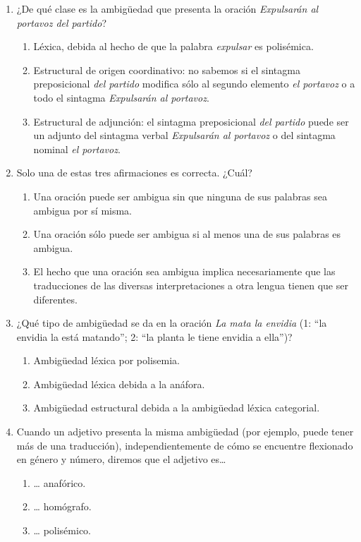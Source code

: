 \begin{enumerate}
\item ¿De qué clase es la ambigüedad que presenta la oración \emph{Expulsarán al portavoz del partido}? \begin{enumerate} \item Léxica, debida al hecho de que la palabra \emph{expulsar} es polisémica. \item Estructural de origen coordinativo: no sabemos si el sintagma preposicional \emph{del partido} modifica sólo al segundo elemento \emph{el portavoz} o a todo el sintagma \emph{Expulsarán al portavoz}. \item Estructural de adjunción: el sintagma preposicional \emph{del partido} puede ser un adjunto del sintagma verbal \emph{Expulsarán al portavoz} o del sintagma nominal \emph{el portavoz}. \end{enumerate} 

\item Solo una de estas tres afirmaciones es correcta. ¿Cuál? \begin{enumerate} \item Una oración puede ser ambigua sin que ninguna de sus palabras sea ambigua por sí misma. \item Una oración sólo puede ser ambigua si al menos una de sus palabras es ambigua. \item El hecho que una oración sea ambigua implica necesariamente que las traducciones de las diversas interpretaciones a otra lengua tienen que ser diferentes. \end{enumerate} 

\item ¿Qué tipo de ambigüedad se da en la oración \emph{La mata la envidia} (1: ``la envidia la está matando''; 2: ``la planta le tiene envidia a ella'')? \begin{enumerate} \item Ambigüedad léxica por polisemia. \item Ambigüedad léxica debida a la anáfora. \item Ambigüedad estructural debida a la ambigüedad léxica categorial. \end{enumerate} 

\item Cuando un adjetivo presenta la misma ambigüedad (por ejemplo, puede tener más de una traducción), independientemente de cómo se encuentre flexionado en género y número, diremos que el adjetivo es{\ldots} \begin{enumerate} \item {\ldots} anafórico. \item {\ldots} homógrafo. \item {\ldots} polisémico. \end{enumerate} 


\end{enumerate}

